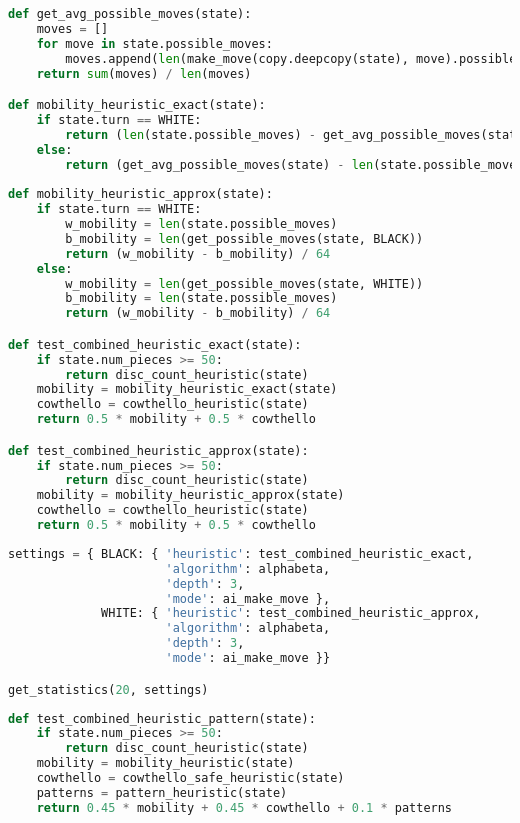 \begin{lstlisting}[language=Python]
def get_avg_possible_moves(state):
    moves = []
    for move in state.possible_moves:
        moves.append(len(make_move(copy.deepcopy(state), move).possible_moves))
    return sum(moves) / len(moves)

def mobility_heuristic_exact(state):
    if state.turn == WHITE:
        return (len(state.possible_moves) - get_avg_possible_moves(state)) / 64
    else:
        return (get_avg_possible_moves(state) - len(state.possible_moves)) / 64
    
def mobility_heuristic_approx(state):
    if state.turn == WHITE:
        w_mobility = len(state.possible_moves)
        b_mobility = len(get_possible_moves(state, BLACK))
        return (w_mobility - b_mobility) / 64
    else:
        w_mobility = len(get_possible_moves(state, WHITE))
        b_mobility = len(state.possible_moves)
        return (w_mobility - b_mobility) / 64

def test_combined_heuristic_exact(state):
    if state.num_pieces >= 50:
        return disc_count_heuristic(state)
    mobility = mobility_heuristic_exact(state)
    cowthello = cowthello_heuristic(state)
    return 0.5 * mobility + 0.5 * cowthello

def test_combined_heuristic_approx(state):
    if state.num_pieces >= 50:
        return disc_count_heuristic(state)
    mobility = mobility_heuristic_approx(state)
    cowthello = cowthello_heuristic(state)
    return 0.5 * mobility + 0.5 * cowthello
\end{lstlisting}

\begin{lstlisting}[language=Python]
settings = { BLACK: { 'heuristic': test_combined_heuristic_exact,
                      'algorithm': alphabeta,
                      'depth': 3,
                      'mode': ai_make_move },
             WHITE: { 'heuristic': test_combined_heuristic_approx,
                      'algorithm': alphabeta,
                      'depth': 3,
                      'mode': ai_make_move }}

get_statistics(20, settings)
\end{lstlisting}

\begin{lstlisting}[language=Python]
def test_combined_heuristic_pattern(state):
    if state.num_pieces >= 50:
        return disc_count_heuristic(state)
    mobility = mobility_heuristic(state)
    cowthello = cowthello_safe_heuristic(state)
    patterns = pattern_heuristic(state)
    return 0.45 * mobility + 0.45 * cowthello + 0.1 * patterns
\end{lstlisting}

